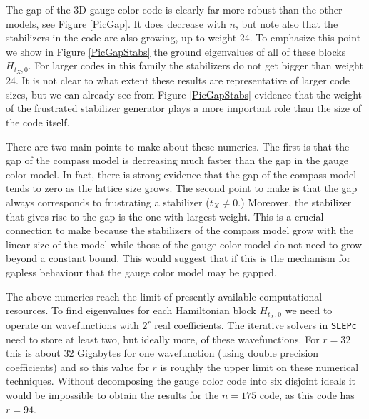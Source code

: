 The gap of the 3D gauge color code is clearly far more
robust than the other models, see Figure \ref{PicGap}.
It does decrease with $n$, but note also that the
stabilizers in the code are also growing, up to weight 24.
To emphasize this point we show in Figure \ref{PicGapStabs}
the ground eigenvalues of all of these blocks $H_{t_X,0}.$
For larger codes in this family the stabilizers do not get
bigger than weight 24.
It is not clear to what extent these results are
representative of larger code sizes, but we
can already see from Figure \ref{PicGapStabs} 
evidence that 
the weight of the frustrated stabilizer generator plays a more
important role than the size of the code itself.


There are two main points to make about these numerics.
The first is that the gap of the compass model 
is decreasing much faster than the gap in the gauge color model.
In fact, there is strong evidence \cite{Dorier2005} 
that the gap of the compass model
tends to zero as the lattice size grows.
The second point to make
is that the gap always corresponds to frustrating
a stabilizer ($t_X\ne 0.$) 
Moreover, the stabilizer that
gives rise to the gap is the one with largest weight.
This is a crucial connection to make because the
stabilizers of the compass model grow with the linear
size of the model
while those of the gauge color model
do not need to grow beyond a constant bound.
This would suggest that if this is the mechanism for
gapless behaviour that the gauge color model may
be gapped.

The above numerics reach the limit of presently available 
computational resources.
To find eigenvalues for each Hamiltonian block $H_{t_X,0}$
we need to operate on wavefunctions with $2^r$ real coefficients.
The iterative solvers in {\tt SLEPc} need to store at least two,
but ideally more, of these wavefunctions.
For $r=32$ this is about 32 Gigabytes for one wavefunction (using double
precision coefficients) and so this value for $r$ is roughly the
upper limit on these numerical techniques.
Without decomposing the gauge color code into six disjoint ideals
it would be impossible to obtain the results for the $n=175$ code,
as this code has $r=94$.

